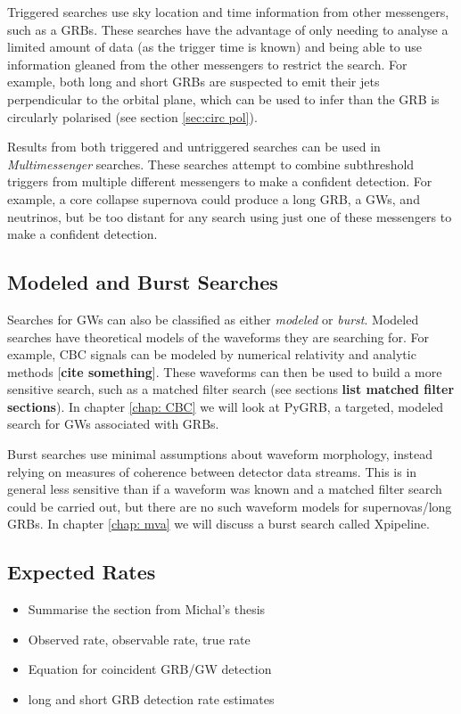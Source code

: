 \documentclass[11pt]{cuthesis}
\begin{document}
Triggered searches use sky location and time information from other messengers, such as a GRBs. These searches have the advantage of only needing to analyse a limited amount of data (as the trigger time is known) and being able to use information gleaned from the other messengers to restrict the search. For example, both long and short GRBs are suspected to emit their jets perpendicular to the orbital plane, which can be used to infer than the GRB is circularly polarised (see section \ref{sec:circ pol}). 

Results from both triggered and untriggered searches can be used in \textit{Multimessenger} searches. These searches attempt to combine subthreshold triggers from multiple different messengers to make a confident detection. For example, a core collapse supernova could produce a long GRB, a GWs, and neutrinos, but be too distant for any search using just one of these messengers to make a confident detection. 

\subsection{Modeled and Burst Searches}
Searches for GWs can also be classified as either \textit{modeled} or \textit{burst}. Modeled searches have theoretical models of the waveforms they are searching for. For example, CBC signals can be modeled by numerical relativity and analytic methods [\textbf{cite something}]. These waveforms can then be used to build a more sensitive search, such as a matched filter search (see sections \textbf{list matched filter sections}). In chapter \ref{chap: CBC} we will look at PyGRB, a targeted, modeled search for GWs associated with GRBs. 

Burst searches use minimal assumptions about waveform morphology, instead relying on measures of coherence between detector data streams. This is in general less sensitive than if a waveform was known and a matched filter search could be carried out, but there are no such waveform models for supernovas/long GRBs. In chapter \ref{chap: mva} we will discuss a burst search called Xpipeline. 


\subsection{Expected Rates}
\begin{itemize}
\item Summarise the section from Michal's thesis
\item Observed rate, observable rate, true rate
\item Equation for coincident GRB/GW detection
\item long and short GRB detection rate estimates
\end{itemize}
\end{document}
